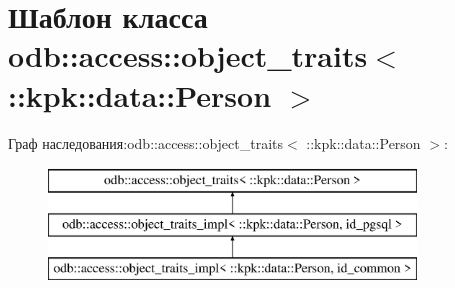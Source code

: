 \hypertarget{classodb_1_1access_1_1object__traits_3_01_1_1kpk_1_1data_1_1_person_01_4}{}\section{Шаблон класса odb\+:\+:access\+:\+:object\+\_\+traits$<$ \+:\+:kpk\+:\+:data\+:\+:Person $>$}
\label{classodb_1_1access_1_1object__traits_3_01_1_1kpk_1_1data_1_1_person_01_4}
Граф наследования\+:odb\+:\+:access\+:\+:object\+\_\+traits$<$ \+:\+:kpk\+:\+:data\+:\+:Person $>$\+:\begin{figure}[H]
\begin{center}
\leavevmode
\includegraphics[height=3.000000cm]{classodb_1_1access_1_1object__traits_3_01_1_1kpk_1_1data_1_1_person_01_4}
\end{center}
\end{figure}
